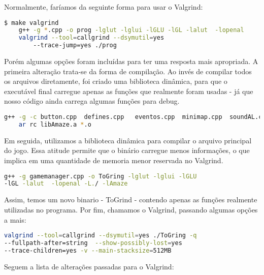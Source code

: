 Normalmente, faríamos da seguinte forma para usar o Valgrind:

\begin{lstlisting}[language=bash,title=\textit{Gerando arquivo callgrind.out},numbers=none]
$ make valgrind
	g++ -g *.cpp -o prog -lglut -lglui -lGLU -lGL -lalut  -lopenal
	valgrind --tool=callgrind --dsymutil=yes 
		--trace-jump=yes ./prog
\end{lstlisting}

Porém algumas opções foram incluídas para ter uma resposta mais apropriada. A primeira alteração trata-se da forma de compilação. Ao invés de compilar todos os arquivos diretamente, foi criado uma biblioteca dinâmica, para que o executável final carregue apenas as funções que realmente foram usadas - já que nosso código ainda carrega algumas funções para debug.

\begin{lstlisting}[language=bash,title=\textit{Gerando uma biblioteca dinâmica},numbers=none]
	g++ -g -c button.cpp  defines.cpp   eventos.cpp  minimap.cpp  soundAL.cpp  textureloader.cpp camera.cpp  entidade.cpp  framerate.cpp  map.cpp          player.cpp   text.cpp     tile.cpp
	ar rc libAmaze.a *.o
\end{lstlisting}

Em seguida, utilizamos a biblioteca dinâmica para compilar o arquivo principal do jogo. Essa atitude permite que o binário carregue menos informações, o que implica em uma quantidade de memoria menor reservada no Valgrind.

\begin{lstlisting}[language=bash,title=\textit{Compilando com a biblioteca dinâmica},numbers=none]
	g++ -g gamemanager.cpp -o ToGring -lglut -lglui -lGLU 
-lGL -lalut  -lopenal -L./ -lAmaze
\end{lstlisting}

Assim, temos um novo binario - ToGrind - contendo apenas as funções realmente utilizadas no programa. Por fim, chamamos o Valgrind, passando algumas opções a mais:

\begin{lstlisting}[language=bash,title=\textit{Chamada personalizada do Valgrind},numbers=none]
	valgrind --tool=callgrind --dsymutil=yes ./ToGring -q 
--fullpath-after=string  --show-possibly-lost=yes 
--trace-children=yes -v --main-stacksize=512MB
\end{lstlisting}

Seguem a lista de alterações passadas para o Valgrind:

